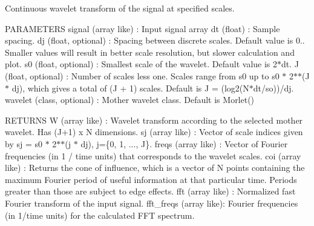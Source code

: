 Continuous wavelet transform of the signal at specified scales. 

P\-A\-R\-A\-M\-E\-T\-E\-R\-S signal (array like) \-: Input signal array dt (float) \-: Sample spacing. dj (float, optional) \-: Spacing between discrete scales. Default value is 0.. Smaller values will result in better scale resolution, but slower calculation and plot. s0 (float, optional) \-: Smallest scale of the wavelet. Default value is 2$\ast$dt. J (float, optional) \-: Number of scales less one. Scales range from s0 up to s0 $\ast$ 2$\ast$$\ast$(J $\ast$ dj), which gives a total of (J + 1) scales. Default is J = (log2(N$\ast$dt/so))/dj. wavelet (class, optional) \-: Mother wavelet class. Default is Morlet()

R\-E\-T\-U\-R\-N\-S W (array like) \-: Wavelet transform according to the selected mother wavelet. Has (J+1) x N dimensions. sj (array like) \-: Vector of scale indices given by sj = s0 $\ast$ 2$\ast$$\ast$(j $\ast$ dj), j=\{0, 1, ..., J\}. freqs (array like) \-: Vector of Fourier frequencies (in 1 / time units) that corresponds to the wavelet scales. coi (array like) \-: Returns the cone of influence, which is a vector of N points containing the maximum Fourier period of useful information at that particular time. Periods greater than those are subject to edge effects. fft (array like) \-: Normalized fast Fourier transform of the input signal. fft\-\_\-freqs (array like)\-: Fourier frequencies (in 1/time units) for the calculated F\-F\-T spectrum.

